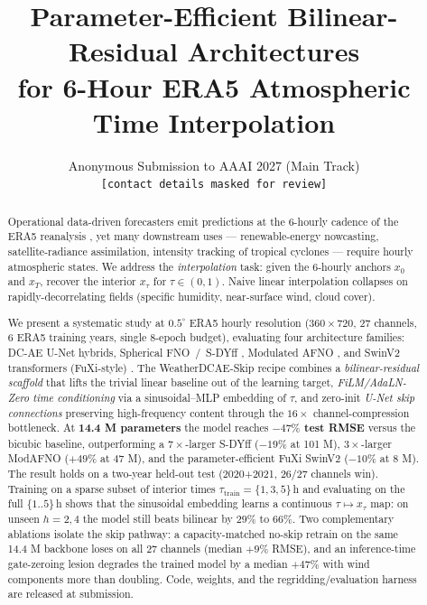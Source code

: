 \documentclass[10pt,letterpaper,twocolumn]{article}
\title{Parameter-Efficient Bilinear-Residual Architectures \\
for 6-Hour ERA5 Atmospheric Time Interpolation}
\author{Anonymous Submission to AAAI 2027 (Main Track) \\
    \texttt{[contact details masked for review]}}
\date{}
\begin{document}
\maketitle

\begin{abstract}
Operational data-driven forecasters \cite{bi2022pangu,lam2023graphcast,bodnar2024aurora,chen2023fuxi,price2024genwc}
emit predictions at the 6-hourly cadence of the ERA5 reanalysis
\cite{hersbach2020era5}, yet many downstream uses --- renewable-energy
nowcasting, satellite-radiance assimilation, intensity tracking of
tropical cyclones --- require hourly atmospheric states. We address the
\emph{interpolation} task: given the 6-hourly anchors
$x_0$ and $x_T$, recover the interior $x_\tau$ for $\tau{\in}(0,1)$.
Naive linear interpolation collapses on rapidly-decorrelating fields
(specific humidity, near-surface wind, cloud cover).

We present a systematic study at $0.5^\circ$ ERA5 hourly resolution
($360{\times}720$, 27 channels, 6 ERA5 training years, single 8-epoch
budget), evaluating four architecture families: DC-AE
\cite{xie2024dcae} U-Net hybrids, Spherical FNO~/~S-DYff
\cite{cachay2023dyffusion,bonev2023sfno}, Modulated AFNO
\cite{leinonen2024modafno,guibas2022afno}, and SwinV2 transformers
(FuXi-style) \cite{chen2023fuxi,liu2022swinv2}. The WeatherDCAE-Skip recipe
combines a \emph{bilinear-residual scaffold} that lifts the trivial
linear baseline out of the learning target, \emph{FiLM/AdaLN-Zero
time conditioning} \cite{peebles2023dit,esser2024sd3} via a
sinusoidal--MLP embedding of $\tau$, and zero-init \emph{U-Net skip
connections} preserving high-frequency content through the
$16{\times}$ channel-compression bottleneck. At
\textbf{14.4 M parameters} the model reaches \textbf{$-47\%$ test RMSE}
versus the bicubic baseline, outperforming a $7{\times}$-larger
S-DYff ($-19\%$ at 101 M), $3{\times}$-larger ModAFNO ($+49\%$ at 47 M),
and the parameter-efficient FuXi SwinV2 ($-10\%$ at 8 M). The result
holds on a two-year held-out test (2020+2021, 26/27 channels win).
Training on a sparse subset of interior times $\tau_\text{train}{=}\{1,3,5\}\,$h
and evaluating on the full $\{1..5\}\,$h shows that the sinusoidal
embedding learns a continuous $\tau \mapsto x_\tau$ map: on unseen
$h{=}2,4$ the model still beats bilinear by $29\%$ to $66\%$. Two
complementary ablations isolate the skip pathway: a capacity-matched
no-skip retrain on the same 14.4 M backbone loses on all 27 channels
(median $+9\%$ RMSE), and an inference-time gate-zeroing lesion
degrades the trained model by a median $+47\%$ with wind components
more than doubling. Code, weights, and the regridding/evaluation
harness are released at submission.
\end{abstract}
\end{document}
